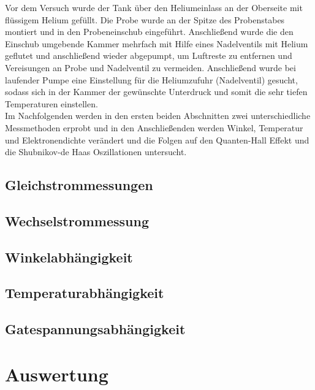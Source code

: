 \documentclass[12pt,a4paper]{article}
\begin{document}
	Vor dem Versuch wurde der Tank über den Heliumeinlass an der Oberseite mit flüssigem Helium gefüllt. Die Probe wurde an der Spitze des Probenstabes montiert und in den Probeneinschub eingeführt. Anschließend wurde die den Einschub umgebende Kammer mehrfach mit Hilfe eines Nadelventils mit Helium geflutet und anschließend wieder abgepumpt, um Luftreste zu entfernen und Vereisungen an Probe und Nadelventil zu vermeiden. Anschließend wurde bei laufender Pumpe eine Einstellung für die Heliumzufuhr (Nadelventil) gesucht, sodass sich in der Kammer der gewünschte Unterdruck und somit die sehr tiefen Temperaturen einstellen.\\
	
	Im Nachfolgenden werden in den ersten beiden Abschnitten zwei unterschiedliche Messmethoden erprobt und in den Anschließenden werden Winkel, Temperatur und Elektronendichte verändert und die Folgen auf den Quanten-Hall Effekt und die Shubnikov-de Haas Oszillationen untersucht.
	
	\subsection{Gleichstrommessungen}
	\label{ch:dc}
	
	\subsection{Wechselstrommessung}
	\label{ch:ac}
	
	\subsection{Winkelabhängigkeit}
	\label{ch:winkel}
	
	\subsection{Temperaturabhängigkeit}
	\label{ch:temp}
	
	\subsection{Gatespannungsabhängigkeit}
	\label{ch:gate}
	
	
	\newpage
	\clearpage
	
	\section{Auswertung}
	\label{chap:auswertung}
	
	
\end{document}
